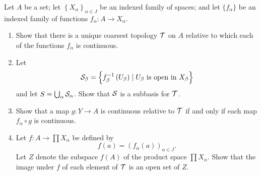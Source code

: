 \begin{ex}{19.10}
    Let $A$ be a set; let $\left\{X_\alpha\right\}_{\alpha\in J}$ be an indexed family of spaces; and let $\{f_\alpha\}$ be an indexed family of functions $f_\alpha:A\to X_\alpha$.
    \begin{enumerate}
        \item Show that there is a unique coarsest topology $\mathcal{T}$ on $A$ relative to which each of the functions $f_\alpha$ is continuous.
        \item Let
            $$\mathcal{S}_\beta =\left\{f^{-1}_\beta\left(U_\beta\right)\mid U_\beta \text{ is open in } X_\beta\right\}$$
            and let $S=\bigcup_\alpha \mathcal{S}_\alpha$. Show that $\mathcal{S}$ is a subbasis for $\mathcal{T}$.
        \item Show that a map $g:Y\to A$ is continuous relative to $\mathcal{T}$ if and only if each map $f_\alpha\circ g$ is continuous. 
        \item Let $f:A\to\prod X_\alpha$ be defined by
            $$ f(a)=\left(f_\alpha(a)\right)_{\alpha\in J}.$$
            Let $Z$ denote the subspace $f(A)$  of the product space $\prod X_\alpha$. Show that the image under $f$ of each element of $\mathcal{T}$ is an open set of $Z$.
    \end{enumerate}
\end{ex}
